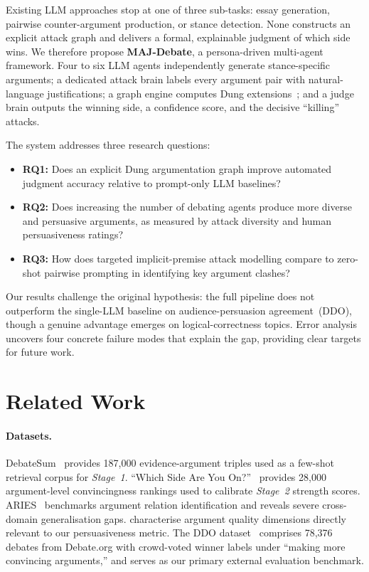\documentclass[11pt,twocolumn,letterpaper]{article}
\newcommand{\sys}{\textbf{MAJ-Debate}}
\newcommand{\stage}[1]{\textit{Stage~#1}}
\newcommand{\DebateSumArgs}{187{,}000}
\newcommand{\WhichSideArgs}{28{,}000}
\newcommand{\DDOTotal}{78{,}376}
\begin{document}
Existing LLM approaches stop at one of three sub-tasks: essay generation,
pairwise counter-argument production, or stance detection.
None constructs an explicit attack graph and delivers a formal, explainable
judgment of which side wins.
We therefore propose \sys{}, a persona-driven multi-agent framework.
Four to six LLM agents independently generate stance-specific arguments;
a dedicated attack brain labels every argument pair with natural-language
justifications; a graph engine computes Dung extensions~\citep{dung1995};
and a judge brain outputs the winning side, a confidence score, and the
decisive ``killing'' attacks.

The system addresses three research questions:

\begin{itemize}
  \item \textbf{RQ1:} Does an explicit Dung argumentation graph improve
        automated judgment accuracy relative to prompt-only LLM baselines?
  \item \textbf{RQ2:} Does increasing the number of debating agents produce
        more diverse and persuasive arguments, as measured by attack diversity
        and human persuasiveness ratings?
  \item \textbf{RQ3:} How does targeted implicit-premise attack modelling
        compare to zero-shot pairwise prompting in identifying key argument
        clashes?
\end{itemize}

Our results challenge the original hypothesis: the full pipeline does not
outperform the single-LLM baseline on audience-persuasion agreement~(DDO),
though a genuine advantage emerges on logical-correctness topics.
Error analysis uncovers four concrete failure modes that explain the gap,
providing clear targets for future work.

\section{Related Work}

\paragraph{Datasets.}
DebateSum~\citep{roush2020debatesum} provides \DebateSumArgs{} evidence-argument
triples used as a few-shot retrieval corpus for \stage{1}.
``Which Side Are You On?''~\citep{li2024whichside} provides
\WhichSideArgs{} argument-level convincingness rankings used to calibrate
\stage{2} strength scores.
ARIES~\citep{gemechu2024aries} benchmarks argument relation identification
and reveals severe cross-domain generalisation gaps.
\citet{ivanova2024lets} characterise argument quality dimensions directly
relevant to our persuasiveness metric.
The DDO dataset~\citep{durmus2019ddo} comprises \DDOTotal{} debates from
Debate.org with crowd-voted winner labels under ``making more convincing
arguments,'' and serves as our primary external evaluation benchmark.
\end{document}
